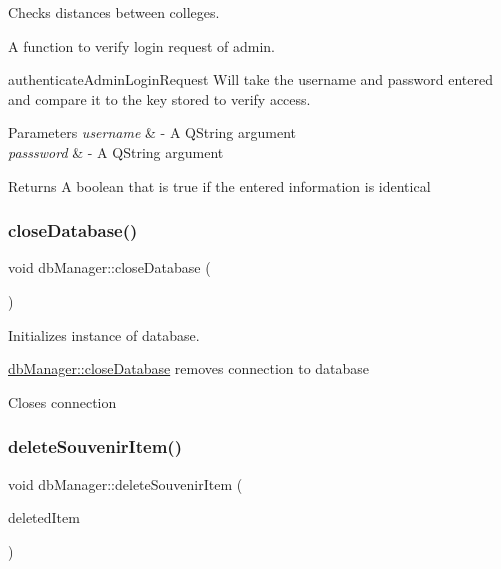 Checks distances between colleges. 

A function to verify login request of admin.

authenticate\+Admin\+Login\+Request Will take the username and password entered and compare it to the key stored to verify access. 
\begin{DoxyParams}{Parameters}
{\em username} & -\/ A Q\+String argument \\
\hline
{\em passsword} & -\/ A Q\+String argument \\
\hline
\end{DoxyParams}
\begin{DoxyReturn}{Returns}
A boolean that is true if the entered information is identical 
\end{DoxyReturn}
\mbox{\label{classdb_manager_a4170bc104b663300dee1fd7390a6ae63}} 
\subsubsection{\texorpdfstring{close\+Database()}{closeDatabase()}}
{\footnotesize\ttfamily void db\+Manager\+::close\+Database (\begin{DoxyParamCaption}{ }\end{DoxyParamCaption})}



Initializes instance of database. 

\mbox{\hyperlink{classdb_manager_a4170bc104b663300dee1fd7390a6ae63}{db\+Manager\+::close\+Database}} removes connection to database

Closes connection \mbox{\label{classdb_manager_a97da73c78035103e648836dbfb927786}} 
\subsubsection{\texorpdfstring{delete\+Souvenir\+Item()}{deleteSouvenirItem()}}
{\footnotesize\ttfamily void db\+Manager\+::delete\+Souvenir\+Item (\begin{DoxyParamCaption}\item[{\mbox{\hyperlink{structsouvenir_item}{souvenir\+Item}}}]{deleted\+Item }\end{DoxyParamCaption})}



